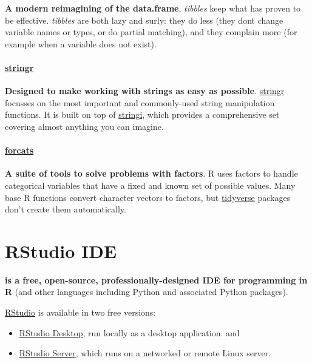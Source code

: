 \documentclass[]{book}
\providecommand{\tightlist}{%
  \setlength{\itemsep}{0pt}\setlength{\parskip}{0pt}}
\theoremstyle{definition}
\theoremstyle{definition}
\theoremstyle{definition}
\theoremstyle{remark}
\begin{document}
\textbf{A modern reimagining of the data.frame}, \emph{tibbles} keep
what has proven to be effective. \emph{tibbles} are both lazy and surly:
they do less (they dont change variable names or types, or do partial
matching), and they complain more (for example when a variable does not
exist).

\hypertarget{stringr}{%
\subsubsection{\texorpdfstring{
\href{http://stringr.tidyverse.org/}{stringr}}{ stringr}}\label{stringr}}

\textbf{Designed to make working with strings as easy as possible}.
\href{http://stringr.tidyverse.org/}{stringr} focusses on the most
important and commonly-used string manipulation functions. It is built
on top of \href{https://github.com/gagolews/stringi}{stringi}, which
provides a comprehensive set covering almost anything you can imagine.

\hypertarget{forcats}{%
\subsubsection{\texorpdfstring{
\href{http://forcats.tidyverse.org/}{forcats}}{ forcats}}\label{forcats}}

\textbf{A suite of tools to solve problems with factors}. R uses factors
to handle categorical variables that have a fixed and known set of
possible values. Many base R functions convert character vectors to
factors, but \href{http://tidyverse.org/}{tidyverse} packages don't
create them automatically.

\hypertarget{rstudio-ide}{%
\chapter{RStudio IDE}\label{rstudio-ide}}

\href{https://www.rstudio.com/products/rstudio}{} \textbf{is a free,
open-source, professionally-designed IDE for programming in R} (and
other languages including Python and associated Python packages).

\href{https://en.wikipedia.org/wiki/RStudio}{RStudio} is available in
two free versions:

\begin{itemize}
\tightlist
\item
  \href{https://www.rstudio.com/products/rstudio/\#Desktop}{RStudio
  Desktop}, run locally as a desktop application. and
\item
  \href{https://www.rstudio.com/products/rstudio/\#Server}{RStudio
  Server}, which runs on a networked or remote Linux server.
\end{itemize}
\end{document}

